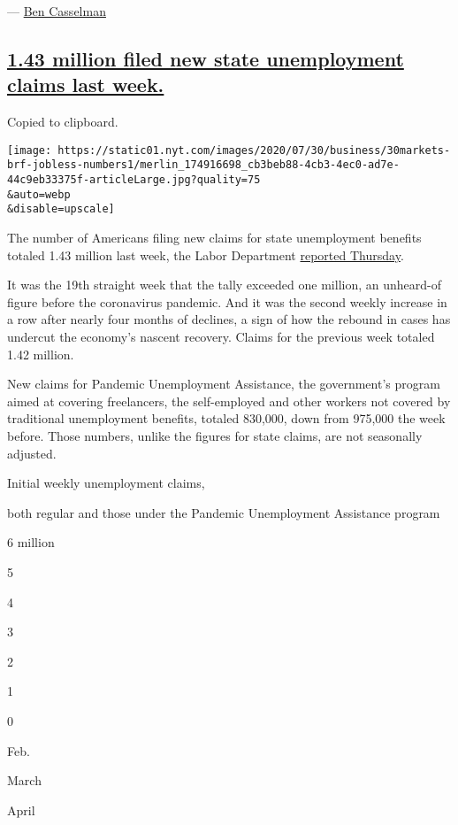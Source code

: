 --- \href{https://www.nytimes.com/by/ben-casselman}{Ben Casselman}

\hypertarget{143-million-filed-new-state-unemployment-claims-last-week}{%
\subsection{\texorpdfstring{\protect\hyperlink{1-43-million-filed-new-state-unemployment-claims-last-week}{1.43
million filed new state unemployment claims last
week.}}{1.43 million filed new state unemployment claims last week.}}\label{143-million-filed-new-state-unemployment-claims-last-week}}

Copied to clipboard.

\texttt{[image: https://static01.nyt.com/images/2020/07/30/business/30markets-brf-jobless-numbers1/merlin\_174916698\_cb3beb88-4cb3-4ec0-ad7e-44c9eb33375f-articleLarge.jpg?quality=75\\\&auto=webp\\\&disable=upscale]}

The number of Americans filing new claims for state unemployment
benefits totaled 1.43 million last week, the Labor Department
\href{https://oui.doleta.gov/press/2020/073020.pdf}{reported Thursday}.

It was the 19th straight week that the tally exceeded one million, an
unheard-of figure before the coronavirus pandemic. And it was the second
weekly increase in a row after nearly four months of declines, a sign of
how the rebound in cases has undercut the economy's nascent recovery.
Claims for the previous week totaled 1.42 million.

New claims for Pandemic Unemployment Assistance, the government's
program aimed at covering freelancers, the self-employed and other
workers not covered by traditional unemployment benefits, totaled
830,000, down from 975,000 the week before. Those numbers, unlike the
figures for state claims, are not seasonally adjusted.

Initial weekly unemployment claims,

both regular and those under the Pandemic Unemployment Assistance
program

6 million

5

4

3

2

1

0

Feb.

March

April

